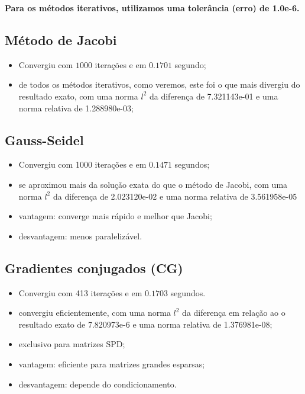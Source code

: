 \documentclass{article} %
\theoremstyle{definition}
\begin{document}
        \bigbreak
        \textbf{Para os métodos iterativos, utilizamos uma tolerância (erro) de 1.0e-6.}
        \subsection*{Método de Jacobi}
            \begin{itemize}
                \item Convergiu com $1000$ iterações e em $0.1701$ segundo;
                \item de todos os métodos iterativos, como veremos, este foi o que mais divergiu
                    do resultado exato, com uma norma $l^2$ da diferença de 7.321143e-01 e uma
                    norma relativa de 1.288980e-03;
            \end{itemize}
        \subsection*{Gauss-Seidel}
            \begin{itemize}
                \item Convergiu com 1000 iterações e em $0.1471$ segundos;
                \item se aproximou mais da solução exata do que o método de Jacobi, com uma norma
                     $l^2$ da diferença de 2.023120e-02 e uma norma relativa de 3.561958e-05
                \item vantagem: converge mais rápido e melhor que Jacobi;
                \item desvantagem: menos paralelizável.
            \end{itemize}

        \subsection*{Gradientes conjugados (CG)}

            \begin{itemize}
                \item Convergiu com 413 iterações e em $0.1703$ segundos.
                \item convergiu eficientemente, com uma norma $l^2$ da diferença em relação ao
                    o resultado exato de 7.820973e-6 e uma norma relativa de 1.376981e-08;
                \item exclusivo para matrizes SPD;
                \item vantagem: eficiente para matrizes grandes esparsas;
                \item desvantagem: depende do condicionamento.
            \end{itemize}
\end{document}
